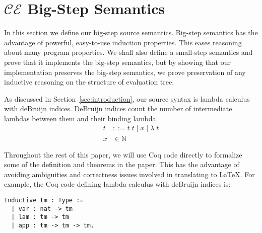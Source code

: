 \section{$\mathcal{CE}$ Big-Step Semantics} \label{sec:cem_big}

In this section we define our big-step source semantics. Big-step semantics
has the advantage of powerful, easy-to-use induction properties. This eases
reasoning about many program properties. We shall also define a small-step
semantics and prove that it implements the big-step semantics, but by showing
that our implementation preserves the big-step semantics, we prove preservation
of any inductive reasoning on the structure of evaluation tree.  

As discussed in Section~\ref{sec:introduction}, our source syntax is lambda calculus with
deBruijn indices. DeBruijn indices count the number of intermediate lambdas
between them and their binding lambda.  
\begin{align*}
 t &::= t \; t \; | \; x \; | \;  \lambda \; t \\
 x &\in \mathbb{N}
\end{align*}

Throughout the rest of this paper, we will use Coq code directly to formalize
some of the definition and theorems in the paper. This has the advantage of
avoiding ambiguities and correctness issues involved in translating to \LaTeX.
For example, the Coq code defining lambda calculus with deBruijn indices is: 

\begin{lstlisting}
Inductive tm : Type := 
  | var : nat -> tm 
  | lam : tm -> tm
  | app : tm -> tm -> tm.
\end{lstlisting}

